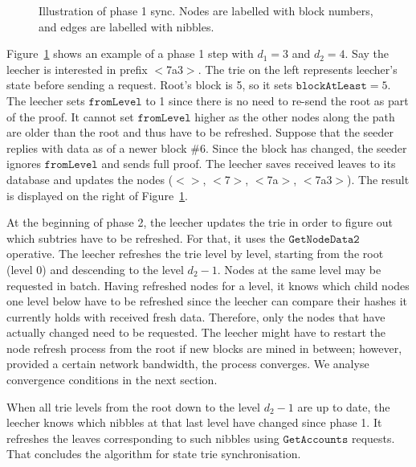 \documentclass{amsart}
\begin{document}
\begin{figure}
\caption{Illustration of phase 1 sync. Nodes are labelled with block numbers, and edges are labelled with nibbles.}
\label{fig:phase1_example}
\end{figure}

Figure~\ref{fig:phase1_example} shows an example of a phase 1 step with $d_1 = 3$ and $d_2 = 4$.
Say the leecher is interested in prefix $<$7a3$>$.
The trie on the left represents leecher's state before sending a request.
Root's block is 5, so it sets $\texttt{blockAtLeast} = 5$.
The leecher sets $\texttt{fromLevel}$ to 1 since there is no need to re-send the root as part of the proof.
It cannot set $\texttt{fromLevel}$ higher as the other nodes along the path are older than the root and thus have to be refreshed.
Suppose that the seeder replies with data as of a newer block \#6.
Since the block has changed, the seeder ignores $\texttt{fromLevel}$ and sends full proof.
The leecher saves received leaves to its database and updates the nodes  ($<>$, $<$7$>$, $<$7a$>$, $<$7a3$>$).
The result is displayed on the right of Figure~\ref{fig:phase1_example}.

At the beginning of phase 2, the leecher updates the trie in order to figure out which subtries have to be refreshed.
For that, it uses the $\texttt{GetNodeData2}$ operative.
The leecher refreshes the trie level by level, starting from the root (level 0) and descending to the level $d_2 - 1$.
Nodes at the same level may be requested in batch.
Having refreshed nodes for a level, it knows which child nodes one level below have to be refreshed since the leecher can compare their hashes it currently holds with received fresh data.
Therefore, only the nodes that have actually changed need to be requested.
The leecher might have to restart the node refresh process from the root if new blocks are mined in between;
however, provided a certain network bandwidth, the process converges.
We analyse convergence conditions in the next section.

When all trie levels from the root down to the level $d_2 - 1$ are up to date,
the leecher knows which nibbles at that last level have changed since phase 1.
It refreshes the leaves corresponding to such nibbles using $\texttt{GetAccounts}$ requests. 
That concludes the algorithm for state trie synchronisation.
\end{document}
